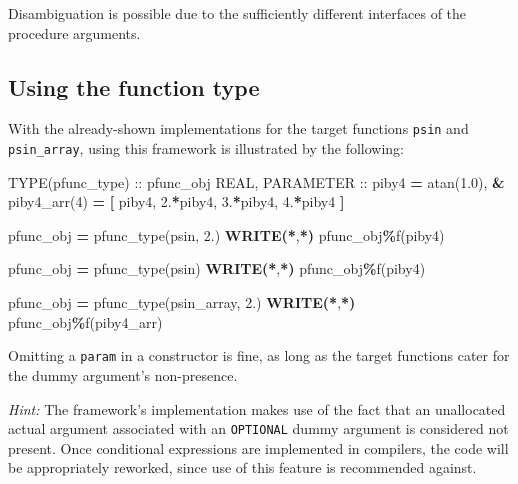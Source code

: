 \documentclass[
  paper=a4,
  ,captions=tableheading
]{scrartcl}
\newenvironment{Shaded}{\begin{snugshade}}{\end{snugshade}}
\newcommand{\BuiltInTok}[1]{#1}
\newcommand{\DataTypeTok}[1]{\textcolor[rgb]{0.13,0.29,0.53}{#1}}
\newcommand{\DecValTok}[1]{\textcolor[rgb]{0.00,0.00,0.81}{#1}}
\newcommand{\FloatTok}[1]{\textcolor[rgb]{0.00,0.00,0.81}{#1}}
\newcommand{\FunctionTok}[1]{\textcolor[rgb]{0.13,0.29,0.53}{\textbf{#1}}}
\newcommand{\KeywordTok}[1]{\textcolor[rgb]{0.13,0.29,0.53}{\textbf{#1}}}
\newcommand{\NormalTok}[1]{#1}
\newcommand{\OperatorTok}[1]{\textcolor[rgb]{0.81,0.36,0.00}{\textbf{#1}}}
\begin{document}
Disambiguation is possible due to the sufficiently different interfaces
of the procedure arguments.

\subsection{Using the function type}\label{using-the-function-type}

With the already-shown implementations for the target functions
\texttt{psin} and \texttt{psin\_array}, using this framework is
illustrated by the following:

\begin{Shaded}
\begin{Highlighting}[]
\DataTypeTok{TYPE(pfunc\_type)} \DataTypeTok{::}\NormalTok{ pfunc\_obj}
\DataTypeTok{REAL}\NormalTok{, }\DataTypeTok{PARAMETER} \DataTypeTok{::}\NormalTok{ piby4 }\KeywordTok{=} \BuiltInTok{atan}\NormalTok{(}\FloatTok{1.0}\NormalTok{), }\KeywordTok{\&}
\NormalTok{   piby4\_arr(}\DecValTok{4}\NormalTok{) }\KeywordTok{=} \KeywordTok{[}\NormalTok{ piby4, }\FloatTok{2.}\KeywordTok{*}\NormalTok{piby4, }\FloatTok{3.}\KeywordTok{*}\NormalTok{piby4, }\FloatTok{4.}\KeywordTok{*}\NormalTok{piby4 }\KeywordTok{]}

\NormalTok{pfunc\_obj }\KeywordTok{=}\NormalTok{ pfunc\_type(psin, }\FloatTok{2.}\NormalTok{)}
\FunctionTok{WRITE(*}\NormalTok{,}\FunctionTok{*)}\NormalTok{ pfunc\_obj}\OperatorTok{\%}\NormalTok{f(piby4)}

\NormalTok{pfunc\_obj }\KeywordTok{=}\NormalTok{ pfunc\_type(psin)}
\FunctionTok{WRITE(*}\NormalTok{,}\FunctionTok{*)}\NormalTok{ pfunc\_obj}\OperatorTok{\%}\NormalTok{f(piby4)}

\NormalTok{pfunc\_obj }\KeywordTok{=}\NormalTok{ pfunc\_type(psin\_array, }\FloatTok{2.}\NormalTok{)}
\FunctionTok{WRITE(*}\NormalTok{,}\FunctionTok{*)}\NormalTok{ pfunc\_obj}\OperatorTok{\%}\NormalTok{f(piby4\_arr)}
\end{Highlighting}
\end{Shaded}

Omitting a \texttt{param} in a constructor is fine, as long as the
target functions cater for the dummy argument's non-presence.

\emph{Hint:} The framework's implementation makes use of the fact that
an unallocated actual argument associated with an \texttt{OPTIONAL}
dummy argument is considered not present. Once conditional expressions
are implemented in compilers, the code will be appropriately reworked,
since use of this feature is recommended against.
\end{document}
